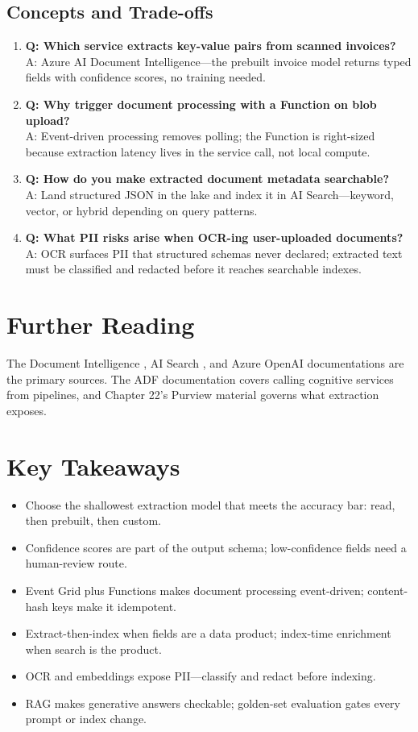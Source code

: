 \subsection{Concepts and Trade-offs}
\begin{enumerate}
    \item \textbf{Q: Which service extracts key-value pairs from scanned invoices?}\\
    A: Azure AI Document Intelligence---the prebuilt invoice model returns typed fields with confidence scores, no training needed.
    \item \textbf{Q: Why trigger document processing with a Function on blob upload?}\\
    A: Event-driven processing removes polling; the Function is right-sized because extraction latency lives in the service call, not local compute.
    \item \textbf{Q: How do you make extracted document metadata searchable?}\\
    A: Land structured JSON in the lake and index it in AI Search---keyword, vector, or hybrid depending on query patterns.
    \item \textbf{Q: What PII risks arise when OCR-ing user-uploaded documents?}\\
    A: OCR surfaces PII that structured schemas never declared; extracted text must be classified and redacted before it reaches searchable indexes.
\end{enumerate}

\section{Further Reading}
The Document Intelligence \cite{microsoft2025docIntelligence}, AI Search \cite{microsoft2025cognitiveSearch}, and Azure OpenAI \cite{microsoft2025azureOpenAI} documentations are the primary sources. The ADF documentation \cite{microsoft2025adf} covers calling cognitive services from pipelines, and Chapter 22's Purview material governs what extraction exposes.

\section*{Key Takeaways}
\begin{itemize}
    \item Choose the shallowest extraction model that meets the accuracy bar: read, then prebuilt, then custom.
    \item Confidence scores are part of the output schema; low-confidence fields need a human-review route.
    \item Event Grid plus Functions makes document processing event-driven; content-hash keys make it idempotent.
    \item Extract-then-index when fields are a data product; index-time enrichment when search is the product.
    \item OCR and embeddings expose PII---classify and redact before indexing.
    \item RAG makes generative answers checkable; golden-set evaluation gates every prompt or index change.
\end{itemize}

